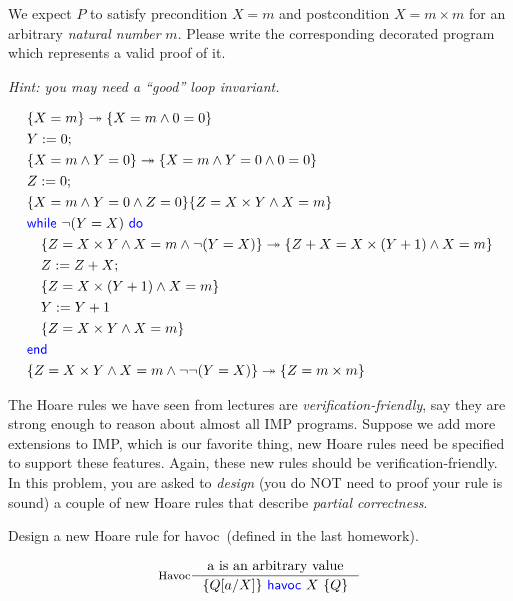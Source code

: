 \documentclass[11pt,a4paper]{article}
\newcommand{\kword}[1]{{\color{blue} \textsf{#1}}}
\newcommand{\While}{\kword{while}}
\newcommand{\Do}{\kword{do}}
\newcommand{\End}{\kword{end}}
\newcommand{\Havoc}{\kword{havoc}}
\let\implies\twoheadrightarrow
\begin{document}
We expect $P$ to satisfy precondition $X = m$ and postcondition $X = m \times m$ for an arbitrary \emph{natural number} $m$.
Please write the corresponding decorated program which represents a valid proof of it.

\emph{Hint: you may need a ``good'' loop invariant.}

\begin{solution}
    \begin{align*}
    & \{X = m\} \implies \{X = m \land 0 = 0\} \\
    & Y := 0; \\
    & \{X = m \land Y = 0\} \implies \{X = m \land Y = 0 \land 0 = 0\} \\
    & Z := 0; \\
    & \{X = m \land Y = 0 \land Z = 0\} \{Z = X \times Y \land X = m\} \\
    & \While~\lnot(Y = X)~\Do \\
    & \quad \{Z = X \times Y \land X = m \land \lnot(Y = X)\} \implies \{Z + X = X \times (Y + 1) \land X = m\} \\
    & \quad Z := Z + X; \\
    & \quad \{Z = X \times (Y + 1) \land X = m\} \\
    & \quad Y := Y + 1 \\
    & \quad \{Z = X \times Y \land X = m\} \\
    & \End \\
    & \{Z = X \times Y \land X = m \land \lnot \lnot (Y = X)\} \implies \{Z = m \times m\}
    \end{align*}
\end{solution}

\newpage
{}

The Hoare rules we have seen from lectures are \emph{verification-friendly}, say they are strong enough to reason about almost all IMP programs.
Suppose we add more extensions to IMP, which is our favorite thing, new Hoare rules need be specified to support these features.
Again, these new rules should be verification-friendly.
In this problem, you are asked to \emph{design} (you do NOT need to proof your rule is sound) a couple of new Hoare rules that describe \emph{partial correctness}.

\subproblem Design a new Hoare rule for \Havoc~(defined in the last homework).

\begin{solution}
  $$\inference[Havoc]{\text{a is an arbitrary value}}{\{Q[a/X]\}~\Havoc~X~\{Q\}}$$
\end{solution}
\end{document}
